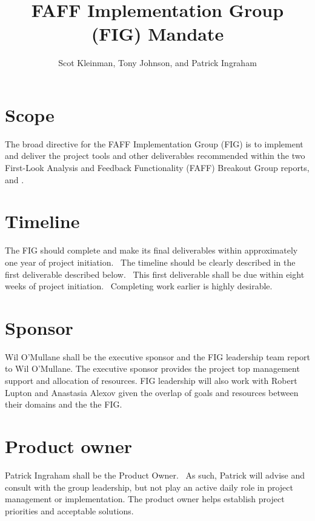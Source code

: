 \documentclass[SE,authoryear]{lsstdoc}
\title{FAFF Implementation Group (FIG) Mandate}
\author{%
Scot Kleinman,
Tony Johnson,
and
Patrick Ingraham
}
\date{\vcsDate}
\begin{document}
\maketitle

\section{Scope}
The broad directive for the FAFF Implementation Group (FIG) is to
implement and deliver the project tools and other deliverables recommended
within the two First-Look Analysis and Feedback Functionality (FAFF)
Breakout Group reports,  and .

\section{Timeline}
The FIG should complete and make its final deliverables within
approximately one year of project initiation.  The timeline should be
clearly described in the first deliverable described below.  This first
deliverable shall be due within eight weeks of project initiation. 
Completing work earlier is highly desirable.


\section{Sponsor}
Wil O’Mullane shall be the executive sponsor and the FIG leadership
team report to Wil O’Mullane.  The executive sponsor provides the
project top management support and allocation of resources.
FIG leadership will also work with Robert Lupton and
Anastasia Alexov given the overlap of goals and
resources between their domains and the the FIG.



\section{Product owner}
Patrick Ingraham shall be the Product Owner.  As such, Patrick will
advise and consult with the group leadership, but not play an active
daily role in project management or implementation.  The product owner
helps establish project priorities and acceptable solutions.
\end{document}
